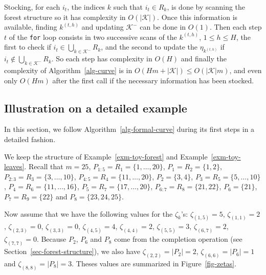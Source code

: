 \documentclass[
  11pt,
  a4paper,
]{article}
\theoremstyle{plain}
\theoremstyle{definition}
\theoremstyle{plain}
\theoremstyle{definition}
\theoremstyle{plain}
\theoremstyle{remark}
\begin{document}
Stocking, for each \(i_t\), the indices \(k\) such that \(i_t\in R_k\),
is done by scanning the forest structure so it has complexity in
\(O(|\mathcal{K}|)\). Once this information is available, finding
\(k^{(t,h)}\) and updating \(\mathcal{K}^-\) can be done in \(O(1)\).
Then each step \(t\) of the \texttt{for} loop consists in two successive
scans of the \(k^{(t,h)}\), \(1\leq h\leq H\), the first to check if
\(i_t\in\bigcup_{k\in\mathcal{K}^-}R_k\), and the second to update the
\(\eta_{k^{(t,h)}}\) if \(i_t\not\in\bigcup_{k\in\mathcal{K}^-}R_k\). So
each step has complexity in \(O(H)\) and finally the complexity of
 Algorithm~\ref{alg-curve}  is in
\(O(Hm+|\mathcal{K}|)\leq O(|\mathcal{K}|m)\), and even only \(O(Hm)\)
after the first call if the necessary information has been stocked.

\subsection{Illustration on a detailed example}\label{sec-example}

In this section, we follow  Algorithm~\ref{alg-formal-curve}  during its
first steps in a detailed fashion.

We keep the structure of Example~\ref{exm-toy-forest} and
Example~\ref{exm-toy-leaves}. Recall that \(m=25\),
\(P_{1:5}=R_1 = \{1, \dotsc , 20 \}\), \(P_1=R_2  =  \{1, 2  \}\),
\(P_{2:3}=R_3   =   \{3 , \dotsc , 10 \}\),
\(P_{4:5}=R_4  =    \{11, \dotsc , 20 \}\), \(P_2=\{3,4\}\),
\(P_3=R_5 =  \{5, \dotsc , 10 \}\),
\(P_4=R_6   =     \{11, \dotsc , 16 \}\),
\(P_5=R_7  =   \{17, \dotsc ,20  \}\), \(P_{6:7}=R_8=\{21,22\}\),
\(P_6=\{21\}\), \(P_7=R_9 = \{22\}\) and \(P_8=\{23,24,25\}\).

Now assume that we have the following values for the \(\zeta_k\)'s:
\(\zeta_{(1,5)}=5\), \(\zeta_{(1, 1)}=2\), \(\zeta_{(2, 3)}=0\),
\(\zeta_{(3, 3)}=0\), \(\zeta_{(4, 5)}=4\), \(\zeta_{(4, 4)}=2\),
\(\zeta_{(5, 5)}=3\), \(\zeta_{(6, 7)}=2\), \(\zeta_{(7, 7)}=0\).
Because \(P_2\), \(P_6\) and \(P_8\) come from the completion operation
(see Section~\ref{sec-forest-structure}), we also have
\(\zeta_{(2, 2)}=|P_2|=2\), \(\zeta_{(6, 6)}=|P_6|=1\) and
\(\zeta_{(8, 8)}=|P_8|=3\). Theses values are summarized in
Figure~\ref{fig-zetas}.
\end{document}
